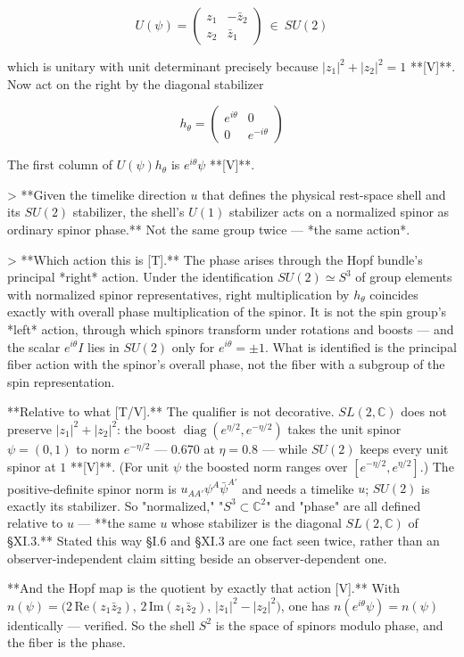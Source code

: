 $$U(\psi) = \begin{pmatrix} z_1 & -\bar z_2\\ z_2 & \bar z_1\end{pmatrix}\ \in\ SU(2)$$

which is unitary with unit determinant precisely because $|z_1|^2+|z_2|^2 = 1$ **[V]**. Now act on the right by the diagonal stabilizer

$$h_\theta = \begin{pmatrix} e^{i\theta} & 0\\ 0 & e^{-i\theta}\end{pmatrix}$$

The first column of $U(\psi)h_\theta$ is $e^{i\theta}\psi$ **[V]**.

> **Given the timelike direction $u$ that defines the physical rest-space shell and its $SU(2)$ stabilizer, the shell's $U(1)$ stabilizer acts on a normalized spinor as ordinary spinor phase.** Not the same group twice — *the same action*.

> **Which action this is [T].** The phase arises through the Hopf bundle's principal *right* action. Under the identification $SU(2)\simeq S^3$ of group elements with normalized spinor representatives, right multiplication by $h_\theta$ coincides exactly with overall phase multiplication of the spinor. It is not the spin group's *left* action, through which spinors transform under rotations and boosts — and the scalar $e^{i\theta}I$ lies in $SU(2)$ only for $e^{i\theta} = \pm1$. What is identified is the principal fiber action with the spinor's overall phase, not the fiber with a subgroup of the spin representation.

**Relative to what [T/V].** The qualifier is not decorative. $SL(2,\mathbb{C})$ does not preserve $|z_1|^2+|z_2|^2$: the boost $\operatorname{diag}(e^{\eta/2},e^{-\eta/2})$ takes the unit spinor $\psi = (0,1)$ to norm $e^{-\eta/2}$ — $0.670$ at $\eta = 0.8$ — while $SU(2)$ keeps every unit spinor at $1$ **[V]**. (For unit $\psi$ the boosted norm ranges over $[e^{-\eta/2},e^{\eta/2}]$.) The positive-definite spinor norm is $u_{AA'}\psi^A\bar\psi^{A'}$ and needs a timelike $u$; $SU(2)$ is exactly its stabilizer. So "normalized," "$S^3\subset\mathbb{C}^2$" and "phase" are all defined relative to $u$ — **the same $u$ whose stabilizer is the diagonal $SL(2,\mathbb{C})$ of §XI.3.** Stated this way §I.6 and §XI.3 are one fact seen twice, rather than an observer-independent claim sitting beside an observer-dependent one.

**And the Hopf map is the quotient by exactly that action [V].** With $n(\psi) = \big(2\,\mathrm{Re}(z_1\bar z_2),\,2\,\mathrm{Im}(z_1\bar z_2),\,|z_1|^2-|z_2|^2\big)$, one has $n(e^{i\theta}\psi) = n(\psi)$ identically — verified. So the shell $S^2$ is the space of spinors modulo phase, and the fiber is the phase.

